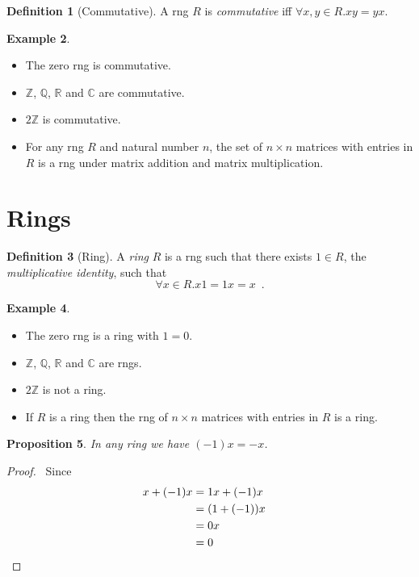 \documentclass{book}
\let\qed\relax
\newtheorem{prop}{Proposition}[chapter]
\theoremstyle{definition}
\newtheorem{df}[prop]{Definition}
\newtheorem{ex}[prop]{Example}
\begin{document}
\begin{df}[Commutative]
A rng $R$ is \emph{commutative} iff $\forall x,y \in R. xy = yx$.
\end{df}

\begin{ex}
\begin{itemize}
\item The zero rng is commutative.
\item $\mathbb{Z}$, $\mathbb{Q}$, $\mathbb{R}$ and $\mathbb{C}$ are commutative.
\item
$2 \mathbb{Z}$ is commutative.
\item For any rng $R$ and natural number $n$, the set of $n \times n$ matrices with entries in $R$ is a rng under matrix addition and matrix multiplication.
\end{itemize}
\end{ex}

\section{Rings}

\begin{df}[Ring]
A \emph{ring} $R$ is a rng such that there exists $1 \in R$, the \emph{multiplicative identity}, such that
\[ \forall x \in R. x1 = 1x = x \enspace . \]
\end{df}

\begin{ex}
\begin{itemize}
\item The zero rng is a ring with $1 = 0$.
\item $\mathbb{Z}$, $\mathbb{Q}$, $\mathbb{R}$ and $\mathbb{C}$ are rngs.
\item $2 \mathbb{Z}$ is not a ring.
\item If $R$ is a ring then the rng of $n \times n$ matrices with entries in $R$ is a ring.
\end{itemize}
\end{ex}

\begin{prop}
In any ring we have $(-1)x = -x$.
\end{prop}

\begin{proof}
\pf\ Since
\begin{align*}
x + (-1)x & = 1x + (-1) x \\
& = (1 + (-1))x \\
& = 0x \\
& = 0 & \qed
\end{align*}
\end{proof}
\end{document}
